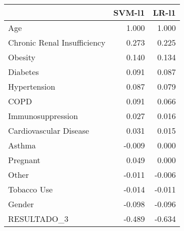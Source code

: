 \begin{tabular}{lrr}
\toprule
{} &  SVM-l1 &  LR-l1 \\
\midrule
Age                         &   1.000 &  1.000 \\
Chronic Renal Insufficiency &   0.273 &  0.225 \\
Obesity                     &   0.140 &  0.134 \\
Diabetes                    &   0.091 &  0.087 \\
Hypertension                &   0.087 &  0.079 \\
COPD                        &   0.091 &  0.066 \\
Immunosuppression           &   0.027 &  0.016 \\
Cardiovascular Disease      &   0.031 &  0.015 \\
Asthma                      &  -0.009 &  0.000 \\
Pregnant                    &   0.049 &  0.000 \\
Other                       &  -0.011 & -0.006 \\
Tobacco Use                 &  -0.014 & -0.011 \\
Gender                      &  -0.098 & -0.096 \\
RESULTADO\_3                 &  -0.489 & -0.634 \\
\bottomrule
\end{tabular}
